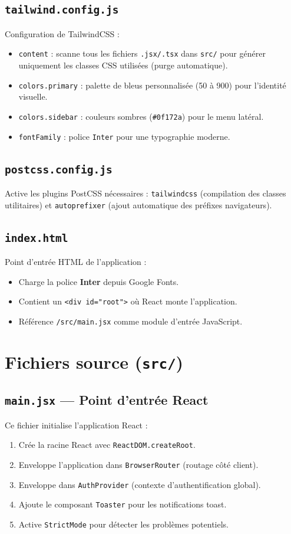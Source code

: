 \documentclass[a4paper,12pt]{report}
\begin{document}
\subsection{\texttt{tailwind.config.js}}
Configuration de TailwindCSS :
\begin{itemize}
  \item \texttt{content} : scanne tous les fichiers \texttt{.jsx/.tsx} dans \texttt{src/} pour générer uniquement les classes CSS utilisées (purge automatique).
  \item \texttt{colors.primary} : palette de bleus personnalisée (50 à 900) pour l'identité visuelle.
  \item \texttt{colors.sidebar} : couleurs sombres (\texttt{\#0f172a}) pour le menu latéral.
  \item \texttt{fontFamily} : police \texttt{Inter} pour une typographie moderne.
\end{itemize}

\subsection{\texttt{postcss.config.js}}
Active les plugins PostCSS nécessaires : \texttt{tailwindcss} (compilation des classes utilitaires) et \texttt{autoprefixer} (ajout automatique des préfixes navigateurs).

\subsection{\texttt{index.html}}
Point d'entrée HTML de l'application :
\begin{itemize}
  \item Charge la police \textbf{Inter} depuis Google Fonts.
  \item Contient un \texttt{<div id="root">} où React monte l'application.
  \item Référence \texttt{/src/main.jsx} comme module d'entrée JavaScript.
\end{itemize}

\section{Fichiers source (\texttt{src/})}

\subsection{\texttt{main.jsx} --- Point d'entrée React}
Ce fichier initialise l'application React :
\begin{enumerate}
  \item Crée la racine React avec \texttt{ReactDOM.createRoot}.
  \item Enveloppe l'application dans \texttt{BrowserRouter} (routage côté client).
  \item Enveloppe dans \texttt{AuthProvider} (contexte d'authentification global).
  \item Ajoute le composant \texttt{Toaster} pour les notifications toast.
  \item Active \texttt{StrictMode} pour détecter les problèmes potentiels.
\end{enumerate}
\end{document}
